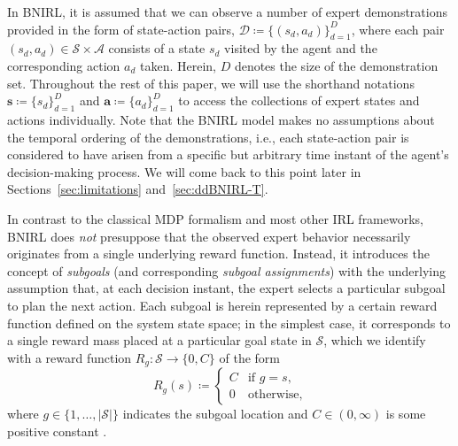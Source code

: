 \documentclass[twoside,11pt]{article}
\newcommand{\defeq}{\coloneqq}
\newcommand{\eqkomma}{,}
\newcommand{\ie}{i.e.}
\begin{document}
In BNIRL,
%
it is assumed that we can observe a number of expert demonstrations provided in the form of state-action pairs, $\mathcal{D} \defeq \{ (s_d,a_d)\}_{d=1}^D$, 
%
%
%
where each pair $(s_d,a_d)\in\mathcal{S}\times\mathcal{A}$ consists of a state $s_d$ visited by the agent and the corresponding action $a_d$ taken. Herein, $D$ denotes the size of the demonstration set. Throughout the rest of this paper, we will %
use the shorthand notations $\mathbf{s}\defeq\{s_d\}_{d=1}^D$ and $\mathbf{a}\defeq\{a_d\}_{d=1}^D$ to access the collections of expert states and actions individually. Note that the BNIRL model makes no assumptions about the temporal ordering of the demonstrations, \ie, each state-action pair is %
considered to have arisen from a specific but arbitrary time instant of the agent's decision-making process. We will come back to this point later in Sections~\ref{sec:limitations} and~\ref{sec:ddBNIRL-T}. %

In contrast to the classical MDP formalism and most other IRL frameworks, BNIRL does \textit{not} %
%
%
presuppose
that the observed expert %
behavior necessarily originates from a single underlying reward function. Instead, it introduces the concept of \textit{subgoals} (and corresponding \textit{subgoal assignments}) with the underlying assumption that, at each decision instant, the expert selects a particular subgoal to plan the next action. %
Each %
subgoal is herein represented by a certain reward function defined on the system state space; in the simplest case, it 
corresponds to a single reward mass placed at a particular goal state %
in $\mathcal{S}$, which we identify with a reward function $R_g:\mathcal{S}\rightarrow\{0,C\}$ of the form
\begin{equation}
R_g(s) \defeq \begin{cases} C & \text{if } g=s\eqkomma \\ 0 & \text{otherwise}\eqkomma \end{cases}
\label{eq:zeroOneReward}
\end{equation}
where $g\in\{1,\ldots,|\mathcal{S}|\}$ indicates the %
subgoal location and $C\in(0,\infty)$ is some positive constant \citep[compare][]{Simsek2005,stolle2002learning,tamassia2015learning}. 
\end{document}

